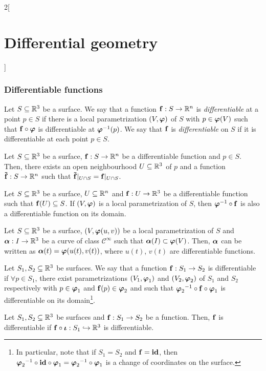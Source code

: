 \documentclass[../../../main.tex]{subfiles}
\begin{document}
\begin{multicols}{2}[\section{Differential geometry}]
  \subsubsection{Differentiable functions}
  \begin{definition}
    Let $S\subseteq\mathbb{R}^3$ be a surface. We say that a function $\boldsymbol{\mathrm{f}}:S\rightarrow \mathbb{R}^n$ is \emph{differentiable} at a point $p\in S$ if there is a local parametrization $(V,\boldsymbol{\mathrm{\varphi}})$ of $S$ with $p\in\boldsymbol{\mathrm{\varphi}}(V)$ such that $\boldsymbol{\mathrm{f}}\circ\boldsymbol{\mathrm{\varphi}}$ is differentiable at ${\boldsymbol{\mathrm{\varphi}}}^{-1}(p)$. We say that $\boldsymbol{\mathrm{f}}$ is \emph{differentiable} on $S$ if it is differentiable at each point $p\in S$.
  \end{definition}
  \begin{proposition}
    Let $S\subseteq\mathbb{R}^3$ be a surface, $\boldsymbol{\mathrm{f}}:S\rightarrow \mathbb{R}^n$ be a differentiable function and $p\in S$. Then, there exists an open neighbourhood $U\subseteq\mathbb{R}^3$ of $p$ and a function $\boldsymbol{\mathrm{\tilde{f}}}:S\rightarrow \mathbb{R}^n$ such that $\boldsymbol{\mathrm{\tilde{f}}}|_{U\cap S}=\boldsymbol{\mathrm{f}}|_{U\cap S}$.
  \end{proposition}
  \begin{corollary}
    Let $S\subseteq\mathbb{R}^3$ be a surface, $U\subseteq \mathbb{R}^n$ and $\boldsymbol{\mathrm{f}}:U\rightarrow \mathbb{R}^3$ be a differentiable function such that $\boldsymbol{\mathrm{f}}(U)\subseteq S$. If $(V,\boldsymbol{\mathrm{\varphi}})$ is a local parametrization of $S$, then ${\boldsymbol{\mathrm{\varphi}}}^{-1}\circ\boldsymbol{\mathrm{f}}$ is also a differentiable function on its domain.
  \end{corollary}
  \begin{corollary}
    Let $S\subseteq\mathbb{R}^3$ be a surface, $(V,\boldsymbol{\mathrm{\varphi}}(u,v))$ be a local parametrization of $S$ and $\boldsymbol{\mathrm{\alpha}}:I\rightarrow\mathbb{R}^3$ be a curve of class $\mathcal{C}^\infty$ such that $\boldsymbol{\mathrm{\alpha}}(I)\subset \boldsymbol{\mathrm{\varphi}}(V)$. Then, $\boldsymbol{\mathrm{\alpha}}$ can be written as $\boldsymbol{\mathrm{\alpha}}(t)=\boldsymbol{\mathrm{\varphi}}(u(t),v(t))$, where $u(t)$, $v(t)$ are differentiable functions.
  \end{corollary}
  \begin{definition}
    Let $S_1,S_2\subseteq\mathbb{R}^3$ be surfaces. We say that a function $\boldsymbol{\mathrm{f}}:S_1\rightarrow S_2$ is differentiable if $\forall p\in S_1$, there exist parametrizations $(V_1,\boldsymbol{\mathrm{\varphi}}_1)$ and $(V_2,\boldsymbol{\mathrm{\varphi}}_2)$ of $S_1$ and $S_2$ respectively with $p\in\boldsymbol{\mathrm{\varphi}}_1$ and $\boldsymbol{\mathrm{f}}(p)\in\boldsymbol{\mathrm{\varphi}}_2$ and such that ${\boldsymbol{\mathrm{\varphi}}_2}^{-1}\circ\boldsymbol{\mathrm{f}}\circ\boldsymbol{\mathrm{\varphi}}_1$ is differentiable on its domain\footnote{In particular, note that if $S_1=S_2$ and $\boldsymbol{\mathrm{f}}=\boldsymbol{\mathrm{\mathrm{id}}}$, then ${\boldsymbol{\mathrm{\varphi}}_2}^{-1}\circ\boldsymbol{\mathrm{\mathrm{id}}}\circ\boldsymbol{\mathrm{\varphi}}_1={\boldsymbol{\mathrm{\varphi}}_2}^{-1}\circ\boldsymbol{\mathrm{\varphi}}_1$ is a change of coordinates on the surface.}.
  \end{definition}
  \begin{proposition}
    Let $S_1,S_2\subseteq\mathbb{R}^3$ be surfaces and $\boldsymbol{\mathrm{f}}:S_1\rightarrow S_2$ be a function. Then, $\boldsymbol{\mathrm{f}}$ is differentiable if $\boldsymbol{\mathrm{f}}\circ\boldsymbol{\mathrm{\iota}}:S_1\hookrightarrow \mathbb{R}^3$ is differentiable.
  \end{proposition}

\end{multicols}
\end{document}
